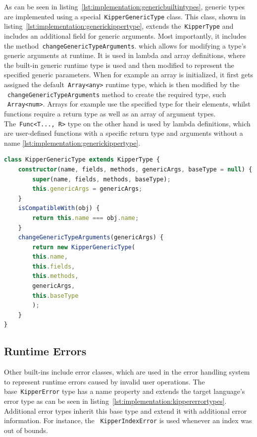 As can be seen in listing~\ref{lst:implementation:genericbuiltintypes}, generic types are implemented using a special~\lstinline|KipperGenericType| class. This class, shown in listing~\ref{lst:implementation:generickippertype}, extends the~\lstinline|KipperType| and includes an additional field for generic arguments. Most importantly, it includes the method~\lstinline|changeGenericTypeArguments|. which allows for modifying a type's generic arguments at runtime. It is used in lambda and array definitions, where the built-in generic runtime type is used and then modified to represent the specified generic parameters. When for example an array is initialized, it first gets assigned the default~\lstinline|Array<any>| runtime type, which is then modified by the ~\lstinline|changeGenericTypeArguments| method to create the required type, such ~\lstinline|Array<num>|. Arrays for example use the specified type for their elements, whilst functions require a return type as well as an array of argument types. The~\lstinline|Func<T..., R>| type on the other hand is used by lambda definitions, which are user-defined functions with a specific return type and arguments without a name \ref{lst:implementation:generickippertype}.

\begin{lstlisting}[language=Typescript,caption=Generic Kipper Type,label=lst:implementation:generickippertype]
class KipperGenericType extends KipperType {
	constructor(name, fields, methods, genericArgs, baseType = null) {
		super(name, fields, methods, baseType);
		this.genericArgs = genericArgs;
	}
	isCompatibleWith(obj) {
		return this.name === obj.name;
	}
	changeGenericTypeArguments(genericArgs) {
		return new KipperGenericType(
		this.name,
		this.fields,
		this.methods,
		genericArgs,
		this.baseType
		);
	}
}
\end{lstlisting}

\subsection{Runtime Errors}

Other built-ins include error classes, which are used in the error handling system to represent runtime errors caused by invalid user operations. The base~\lstinline|KipperError| type has a name property and extends the target language's error type as can be seen in listing~\ref{lst:implementation:kippererrortypes}. Additional error types inherit this base type and extend it with additional error information. For instance, the ~\lstinline|KipperIndexError| is used whenever an index was out of bounds.

